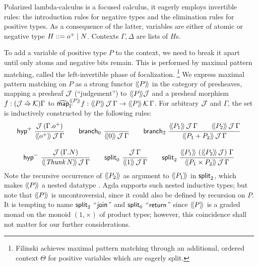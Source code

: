 \documentclass[a4paper,USenglish,cleveref, autoref]{lipics-v2019}
\begin{document}
Polarized lambda-calculus
\cite{zeilberger:PhD,espiritoSanto:entcs17}
is a focused calculus, it eagerly employs
invertible rules: the introduction rules for negative types and the
elimination rules for positive types.  As a consequence of the latter,
variables are either of atomic or negative type $H ::= \patom \mid N$.
Contexts $\Gamma,\Delta$ are lists of $H$s.

To add a variable of positive type $P$ to the context, we need to
break it apart until only atoms and negative bits remain.  This is
performed by maximal pattern matching, called the left-invertible
phase of focalization.%
\footnote{Filinski \cite[Section~4]{filinski:tlca01} achieves maximal pattern
matching through an additional, ordered context $\Theta$ for positive
variables which are eagerly split.}
We express maximal pattern matching on $P$ as a strong functor
$\Add P$ in the category of presheaves,
mapping a presheaf $\J$ (``judgement'') to $\Add P \J$
and a presheaf morphism $f : (\J \hatto \K)\Gamma$ to
$\stmap[\Add P]_\Gamma f : \AddHyp P \J \Gamma \to \AddHyp P \K \Gamma$.
For arbitrary $\J$ and $\Gamma$, the set  is
inductively constructed by the following rules:
\begin{gather*}
  \nru{\phyp}
      {\J\,(\cext \Gamma \patom)}
      {\AddHyp {\patom} \J \Gamma}
\qquad
  \nru{\nbranch}
      {}
      {\AddHyp {\tyzero} \J \Gamma}
\qquad
  \nru{\bbranch}
      {\AddHyp {P_1} \J \Gamma \qquad
       \AddHyp {P_2} \J \Gamma }
      {\AddHyp {P_1 + P_2} \J \Gamma}
\\[2ex]
  \nru{\nhyp}
      {\J\,(\cext \Gamma N)}
      {\AddHyp {\Thunk N} \J \Gamma}
\qquad
  \nru{\nsplit}
      {\J\,\Gamma}
      {\AddHyp {\tyone} \J \Gamma}
\qquad
  \nru{\bsplit}
      {\AddHyp {P_1} {\left(\Add{P_2}\,\J\right)} \Gamma}
      {\AddHyp {P_1 \times P_2} \J \Gamma}
\end{gather*}
Note the recursive occurrence of $\Add{P_2}$ as argument to
$\Add{P_1}$ in $\bsplit$, which makes $\Add P$ a nested datatype
\cite{bird:nested}.  Agda supports such nested inductive types; but
note that $\Add{P}$ is uncontroversial, since it could also be defined
by recursion on $P$.   It is tempting to name $\bsplit$
``$\tjoin$'' and $\nsplit$ ``$\treturn$''
since $\Add P$ is a graded monad on the monoid $(1,\times)$
of product types;
however, this coincidence shall not matter for our further considerations.
\end{document}
